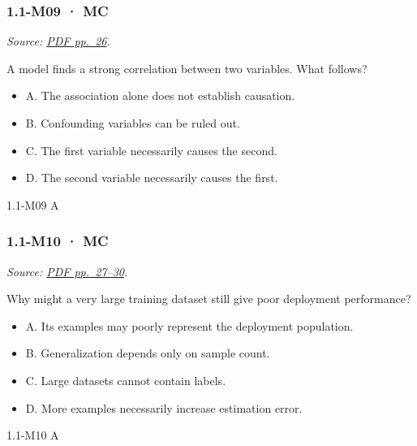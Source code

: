 \noindent\begin{minipage}{\linewidth}

\subsubsection{1.1-M09 · MC}\label{m09-mc}

\emph{Source:
\href{../Lecture\%20Slides/1.1.\%20Fundamentals.pdf\#page=26}{PDF
pp.~26}.}

A model finds a strong correlation between two variables. What follows?

\begin{itemize}
\tightlist
\item
  A. The association alone does not establish causation.
\item
  B. Confounding variables can be ruled out.
\item
  C. The first variable necessarily causes the second.
\item
  D. The second variable necessarily causes the first.
\end{itemize}

\begin{solution}[8mm]{1.1-M09}
A
\end{solution}
\end{minipage}\par\medskip

\noindent\begin{minipage}{\linewidth}

\subsubsection{1.1-M10 · MC}\label{m10-mc}

\emph{Source:
\href{../Lecture\%20Slides/1.1.\%20Fundamentals.pdf\#page=27}{PDF
pp.~27--30}.}

Why might a very large training dataset still give poor deployment
performance?

\begin{itemize}
\tightlist
\item
  A. Its examples may poorly represent the deployment population.
\item
  B. Generalization depends only on sample count.
\item
  C. Large datasets cannot contain labels.
\item
  D. More examples necessarily increase estimation error.
\end{itemize}

\begin{solution}[8mm]{1.1-M10}
A
\end{solution}
\end{minipage}\par\medskip

